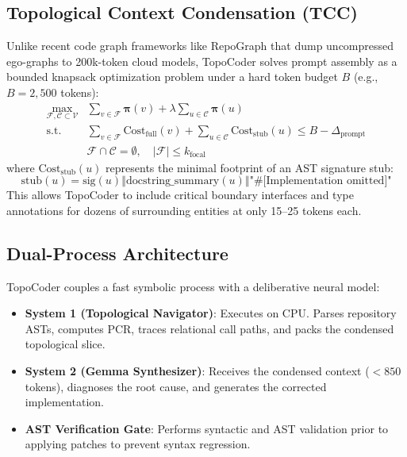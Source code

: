 \documentclass[11pt,a4paper]{article}
\begin{document}
\subsection{Topological Context Condensation (TCC)}
Unlike recent code graph frameworks like RepoGraph \cite{ouyang2024repograph} that dump uncompressed ego-graphs to 200k-token cloud models, TopoCoder solves prompt assembly as a bounded knapsack optimization problem under a hard token budget $B$ (e.g., $B = 2,500$ tokens):
\begin{align}
\max_{\mathcal{F}, \mathcal{C} \subset \mathcal{V}} & \sum_{v \in \mathcal{F}} \mathbf{\pi}(v) + \lambda \sum_{u \in \mathcal{C}} \mathbf{\pi}(u) \\
\text{s.t.} \quad & \sum_{v \in \mathcal{F}} \text{Cost}_{\text{full}}(v) + \sum_{u \in \mathcal{C}} \text{Cost}_{\text{stub}}(u) \le B - \Delta_{\text{prompt}} \\
& \mathcal{F} \cap \mathcal{C} = \emptyset, \quad |\mathcal{F}| \le k_{\text{focal}}
\end{align}
where $\text{Cost}_{\text{stub}}(u)$ represents the minimal footprint of an AST signature stub:
\begin{equation}
\text{stub}(u) = \text{sig}(u) \mathbin{\Vert} \text{docstring\_summary}(u) \mathbin{\Vert} \text{"\# [Implementation omitted]"}
\end{equation}
This allows TopoCoder to include critical boundary interfaces and type annotations for dozens of surrounding entities at only 15--25 tokens each.

\subsection{Dual-Process Architecture}
TopoCoder couples a fast symbolic process with a deliberative neural model:
\begin{itemize}
    \item \textbf{System 1 (Topological Navigator)}: Executes on CPU. Parses repository ASTs, computes PCR, traces relational call paths, and packs the condensed topological slice.
    \item \textbf{System 2 (Gemma Synthesizer)}: Receives the condensed context ($<850$ tokens), diagnoses the root cause, and generates the corrected implementation.
    \item \textbf{AST Verification Gate}: Performs syntactic and AST validation prior to applying patches to prevent syntax regression.
\end{itemize}
\end{document}
